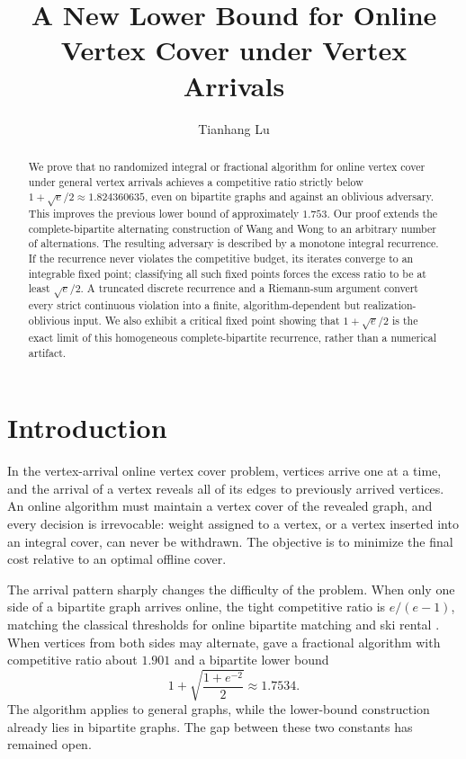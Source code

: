 \documentclass[11pt,letterpaper]{article}
\title{A New Lower Bound for Online Vertex Cover under Vertex Arrivals}
\author{Tianhang Lu}
\date{}
\theoremstyle{definition}
\theoremstyle{remark}
\begin{document}
\maketitle

\begin{abstract}
We prove that no randomized integral or fractional algorithm for online vertex cover under general vertex arrivals achieves a competitive ratio strictly below $1+\sqrt{e}/2\approx1.824360635$, even on bipartite graphs and against an oblivious adversary.
This improves the previous lower bound of approximately $1.753$.
Our proof extends the complete-bipartite alternating construction of Wang and Wong to an arbitrary number of alternations.
The resulting adversary is described by a monotone integral recurrence.
If the recurrence never violates the competitive budget, its iterates converge to an integrable fixed point; classifying all such fixed points forces the excess ratio to be at least $\sqrt{e}/2$.
A truncated discrete recurrence and a Riemann-sum argument convert every strict continuous violation into a finite, algorithm-dependent but realization-oblivious input.
We also exhibit a critical fixed point showing that $1+\sqrt{e}/2$ is the exact limit of this homogeneous complete-bipartite recurrence, rather than a numerical artifact.
\end{abstract}

\section{Introduction}

In the vertex-arrival online vertex cover problem, vertices arrive one at a time, and the arrival of a vertex reveals all of its edges to previously arrived vertices.
An online algorithm must maintain a vertex cover of the revealed graph, and every decision is irrevocable: weight assigned to a vertex, or a vertex inserted into an integral cover, can never be withdrawn.
The objective is to minimize the final cost relative to an optimal offline cover.

The arrival pattern sharply changes the difficulty of the problem.
When only one side of a bipartite graph arrives online, the tight competitive ratio is $e/(e-1)$, matching the classical thresholds for online bipartite matching and ski rental \citep{KarpEtAl1990,KarlinEtAl1994,WangWong2015}.
When vertices from both sides may alternate, \citet{WangWong2015} gave a fractional algorithm with competitive ratio about $1.901$ and a bipartite lower bound
$$
1+\sqrt{\frac{1+e^{-2}}{2}}\approx1.7534.
$$
The algorithm applies to general graphs, while the lower-bound construction already lies in bipartite graphs.
The gap between these two constants has remained open.
\end{document}
